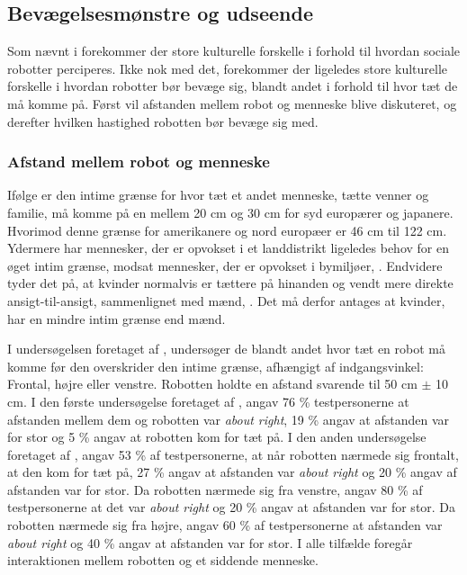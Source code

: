 \subsection{Bevægelsesmønstre og udseende}
\label{InteraktionSocialeRobotterParametreBevaegelsesmoenstre}
%
Som nævnt i  forekommer der store kulturelle forskelle i forhold til hvordan sociale robotter perciperes. Ikke nok med det, forekommer der ligeledes store kulturelle forskelle i hvordan robotter bør bevæge sig, blandt andet i forhold til hvor tæt de må komme på. Først vil afstanden mellem robot og menneske blive diskuteret, og derefter hvilken hastighed robotten bør bevæge sig med. 

\subsubsection*{Afstand mellem robot og menneske}
\label{InteraktionSocialeRobotterParametreBevaegelsesmoenstreAfstand}
%
Ifølge \textcite[s. 178]{PDF:HowMayIServeYou} er den intime grænse for hvor tæt et andet menneske, tætte venner og familie, må komme på en mellem 20 cm og 30 cm for syd europærer og japanere. Hvorimod denne grænse for amerikanere og nord europæer er 46 cm til 122 cm. Ydermere har mennesker, der er opvokset i et landdistrikt ligeledes behov for en øget intim grænse, modsat mennesker, der er opvokset i bymiljøer, \textcite[s. 178]{PDF:HowMayIServeYou}. Endvidere tyder det på, at kvinder normalvis er tættere på hinanden og vendt mere direkte ansigt-til-ansigt, sammenlignet med mænd, \parencite[s. 178]{PDF:HowMayIServeYou}. Det må derfor antages at kvinder, har en mindre intim grænse end mænd.

I undersøgelsen foretaget af \textcite{PDF:HowMayIServeYou}, undersøger de blandt andet hvor tæt en robot må komme før den overskrider den intime grænse, afhængigt af indgangsvinkel: Frontal, højre eller venstre. Robotten holdte en afstand svarende til 50 cm $\pm$ 10 cm. I den første undersøgelse foretaget af \textcite[s. 174]{PDF:HowMayIServeYou}, angav 76 \% testpersonerne at afstanden mellem dem og robotten var \textit{about right}, 19 \% angav at afstanden var for stor og 5 \% angav at robotten kom for tæt på. I den anden undersøgelse foretaget af \textcite[s. 175]{PDF:HowMayIServeYou}, angav 53 \% af testpersonerne, at når robotten nærmede sig frontalt, at den kom for tæt på, 27 \% angav at afstanden var \textit{about right} og 20 \% angav af afstanden var for stor. Da robotten nærmede sig fra venstre, angav 80 \% af testpersonerne at det var \textit{about right} og 20 \% angav at afstanden var for stor. Da robotten nærmede sig fra højre, angav 60 \% af testpersonerne at afstanden var \textit{about right} og 40 \% angav at afstanden var for stor. I alle tilfælde foregår interaktionen mellem robotten og et siddende menneske.

